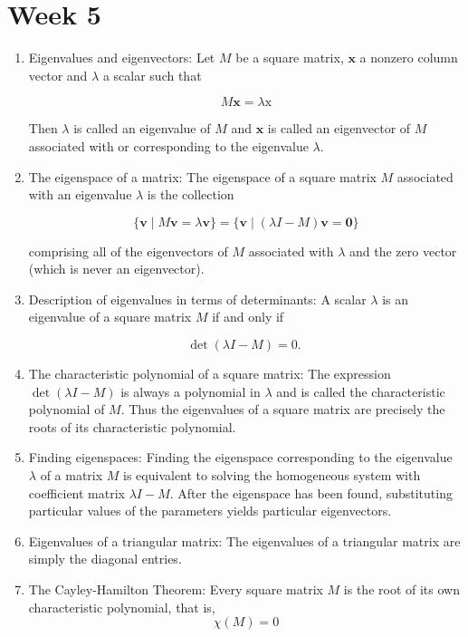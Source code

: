 \documentclass{article}
\begin{document}
\section{Week 5}
\begin{enumerate}
    \item Eigenvalues and eigenvectors: Let $M$ be a square matrix, $\mathbf{x}$ a nonzero column vector and $\lambda$ a scalar such that

    $$
    M \mathbf{x}=\lambda \mathrm{x}
    $$

    Then $\lambda$ is called an eigenvalue of $M$ and $\mathbf{x}$ is called an eigenvector of $M$ associated with or corresponding to the eigenvalue $\lambda$.

    \item The eigenspace of a matrix: The eigenspace of a square matrix $M$ associated with an eigenvalue $\lambda$ is the collection

    $$
    \{\mathbf{v} \mid M \mathbf{v}=\lambda \mathbf{v}\}=\{\mathbf{v} \mid(\lambda I-M) \mathbf{v}=\mathbf{0}\}
    $$

    comprising all of the eigenvectors of $M$ associated with $\lambda$ and the zero vector (which is never an eigenvector).

    \item Description of eigenvalues in terms of determinants: A scalar $\lambda$ is an eigenvalue of a square matrix $M$ if and only if

    $$
    \operatorname{det}(\lambda I-M)=0 \text {. }
    $$

    \item The characteristic polynomial of a square matrix: The expression $\operatorname{det}(\lambda I-M)$ is always a polynomial in $\lambda$ and is called the characteristic polynomial of $M$. Thus the eigenvalues of a square matrix are precisely the roots of its characteristic polynomial.

    \item Finding eigenspaces: Finding the eigenspace corresponding to the eigenvalue $\lambda$ of a matrix $M$ is equivalent to solving the homogeneous system with coefficient matrix $\lambda I-M$. After the eigenspace has been found, substituting particular values of the parameters yields particular eigenvectors.

    \item Eigenvalues of a triangular matrix: The eigenvalues of a triangular matrix are simply the diagonal entries.

    \item The Cayley-Hamilton Theorem: Every square matrix $M$ is the root of its own characteristic polynomial, that is,
    $$
    \chi(M)=0
    $$


\end{enumerate}
\end{document}
